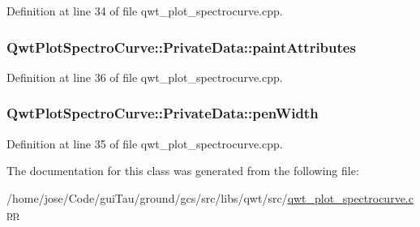 Definition at line 34 of file qwt\-\_\-plot\-\_\-spectrocurve.\-cpp.

\hypertarget{class_qwt_plot_spectro_curve_1_1_private_data_a435f58459ac70eaea2d394af72d5d755}{
\subsubsection[{paint\-Attributes}]{ Qwt\-Plot\-Spectro\-Curve\-::\-Private\-Data\-::paint\-Attributes}}\label{class_qwt_plot_spectro_curve_1_1_private_data_a435f58459ac70eaea2d394af72d5d755}


Definition at line 36 of file qwt\-\_\-plot\-\_\-spectrocurve.\-cpp.

\hypertarget{class_qwt_plot_spectro_curve_1_1_private_data_abd73307d41624cf4bd87b78eb84c2219}{
\subsubsection[{pen\-Width}]{ Qwt\-Plot\-Spectro\-Curve\-::\-Private\-Data\-::pen\-Width}}\label{class_qwt_plot_spectro_curve_1_1_private_data_abd73307d41624cf4bd87b78eb84c2219}


Definition at line 35 of file qwt\-\_\-plot\-\_\-spectrocurve.\-cpp.



The documentation for this class was generated from the following file\-:\begin{DoxyCompactItemize}
\item 
/home/jose/\-Code/gui\-Tau/ground/gcs/src/libs/qwt/src/\hyperlink{qwt__plot__spectrocurve_8cpp}{qwt\-\_\-plot\-\_\-spectrocurve.\-cpp}\end{DoxyCompactItemize}
